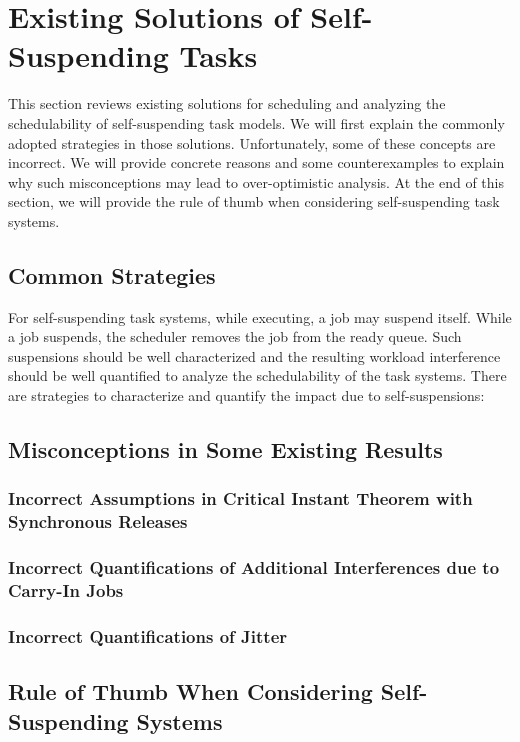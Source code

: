 \section{Existing Solutions of Self-Suspending Tasks}

This section reviews existing solutions for scheduling and analyzing the schedulability of self-suspending task models. We will first explain the commonly adopted strategies in those solutions. Unfortunately, some of these concepts are incorrect. We will provide concrete reasons and some counterexamples to explain why such misconceptions may lead to over-optimistic analysis. At the end of this section, we will provide the rule of thumb when considering self-suspending task systems. 


\subsection{Common Strategies}

For self-suspending task systems, while executing, a job may suspend itself. While a job suspends, the scheduler removes the job from the ready queue. Such suspensions should be well characterized and the resulting workload interference should be well quantified to analyze the schedulability of the task systems. There are strategies to characterize and quantify the impact due to self-suspensions:



\subsection{Misconceptions in Some Existing Results}
\subsubsection{Incorrect Assumptions in Critical Instant Theorem with Synchronous Releases}
\subsubsection{Incorrect Quantifications of Additional Interferences due to Carry-In Jobs}
\subsubsection{Incorrect Quantifications of Jitter}
\subsection{Rule of Thumb When Considering Self-Suspending Systems}
  
  
  
  